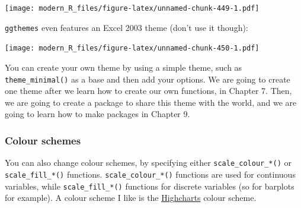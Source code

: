 \documentclass[]{gitbook}
\newenvironment{Shaded}{\begin{snugshade}}{\end{snugshade}}
\newcommand{\DataTypeTok}[1]{\textcolor[rgb]{0.13,0.29,0.53}{#1}}
\newcommand{\KeywordTok}[1]{\textcolor[rgb]{0.13,0.29,0.53}{\textbf{#1}}}
\newcommand{\NormalTok}[1]{#1}
\newcommand{\OperatorTok}[1]{\textcolor[rgb]{0.81,0.36,0.00}{\textbf{#1}}}
\newcommand{\StringTok}[1]{\textcolor[rgb]{0.31,0.60,0.02}{#1}}
\begin{document}
\texttt{[image: modern\_R\_files/figure-latex/unnamed-chunk-449-1.pdf]}

\texttt{ggthemes} even features an Excel 2003 theme (don't use it though):

\begin{Shaded}
\end{Shaded}

\texttt{[image: modern\_R\_files/figure-latex/unnamed-chunk-450-1.pdf]}

You can create your own theme by using a simple theme, such as \texttt{theme\_minimal()} as a base
and then add your options. We are going to create one theme after we learn how to create our
own functions, in Chapter 7. Then, we are going to create a package to share this theme with
the world, and we are going to learn how to make packages in Chapter 9.

\hypertarget{colour-schemes}{%
\subsubsection{Colour schemes}\label{colour-schemes}}

You can also change colour schemes, by specifying either \texttt{scale\_colour\_*()} or \texttt{scale\_fill\_*()}
functions. \texttt{scale\_colour\_*()} functions are used for continuous variables, while \texttt{scale\_fill\_*()}
functions for discrete variables (so for barplots for example). A colour scheme I like is the
\href{https://www.highcharts.com/}{Highcharts} colour scheme.
\end{document}
